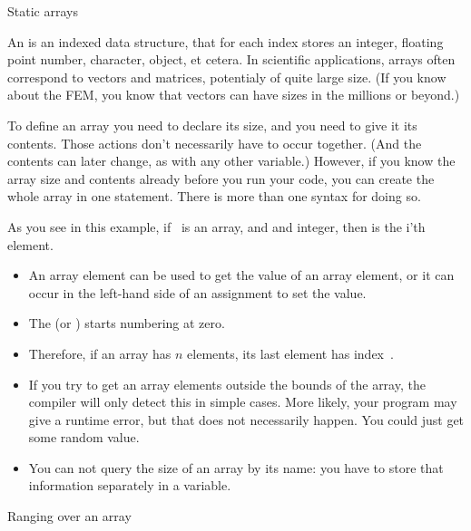 
 {Static arrays}
\label{sec:staticarray}

An  is an indexed data structure, that for each
index stores an integer, floating point number, character,
object, et cetera.
In scientific applications, arrays often correspond to vectors and
matrices, potentialy of quite large size. (If you know about the
\acf{FEM}, you know that vectors can have sizes in the millions or beyond.)

To define an array you need to declare its size, and you need to give
it its contents. Those actions don't necessarily have to occur
together. (And the contents can later change, as with any other variable.)
However, 
if you know the array size and contents already before you run your
code, you can create the whole array in one statement. There is more
than one syntax for doing so.
%

As you see in this example, if ~is an array, and  and
integer, then  is the i'th element.
\begin{itemize}
\item An array element  can be used to get the value of an
  array element, or it can occur in the left-hand side of an
  assignment to set the value.
\item The  (or
  )  starts numbering at zero.
\item Therefore, if an array has $n$ elements, its last element has
  index~.
\item If you try to get an array elements outside the bounds of the
  array, the compiler will only detect this in simple cases. More
  likely, your program may give a runtime error, but that does not
  necessarily happen. You could just get some random value.
\item You can not query the size of an array by its name: you have to
  store that information separately in a variable.
\end{itemize}

 {Ranging over an array}
\label{sec:arrayrange}

